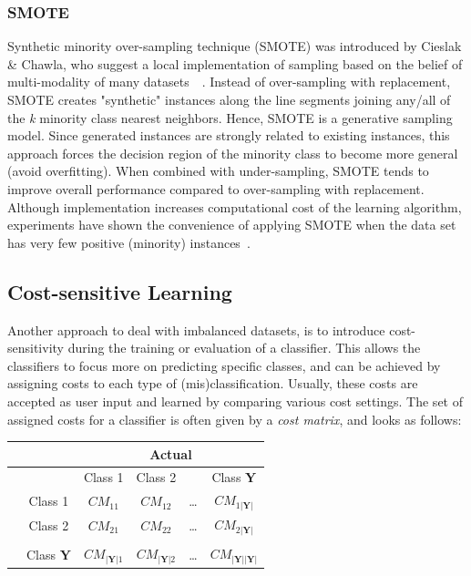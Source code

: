 \subsubsection{SMOTE}\label{smote}
Synthetic minority over-sampling technique (SMOTE) was introduced by Cieslak \& Chawla, who suggest a local implementation of sampling based on the belief of multi-modality of many datasets~\cite{StartGlobally08}~\cite{smote}.  Instead of over-sampling with replacement, SMOTE creates "synthetic" instances along the line segments joining any/all of the \textit{k} minority class nearest neighbors. Hence, SMOTE is a generative sampling model. Since generated instances are strongly related to existing instances, this approach forces the decision region of the minority class to become more general (avoid overfitting).  When combined with under-sampling, SMOTE tends to improve overall performance compared to over-sampling with replacement.  Although implementation increases computational cost of the learning algorithm, experiments have shown the convenience of applying SMOTE when the data set has very few positive (minority) instances~\cite{batista}.



\subsection{Cost-sensitive Learning}\label{cost-sensitivity}
Another approach to deal with imbalanced datasets, is to introduce cost-sensitivity during the training or evaluation of a classifier. This allows the classifiers to focus more on predicting specific classes, and can be achieved by assigning costs to each type of (mis)classification. Usually, these costs are accepted as user input and learned by comparing various cost settings. The set of assigned costs for a classifier is often given by a \textit{cost matrix}, and looks as follows:

\begin{table}[h]
\centering                            %
\begin{tabular}{|l| c| c c c c|}              %
\hline                                %
& & \multicolumn{4}{|c|}{Actual} \\
\hline 
& & Class 1 & Class 2 & & Class $\mathbf{Y}$\\ [0.5ex]
\hline                                      %
& Class 1 & $CM_{11}$ & $CM_{12}$ & \ldots & $CM_{1|\mathbf{Y}|}$ \\
& Class 2  & $CM_{21}$  &  $CM_{22}$  & \ldots & $CM_{2|\mathbf{Y}|}$ \\
\raisebox{1.5ex}{Predicted}  & & \raisebox{1.5ex}{\ldots} & \raisebox{1.5ex}{\ldots}  & & \raisebox{1.5ex}{\ldots} \\
& Class $\mathbf{Y}$ &  $CM_{|\mathbf{Y}|1}$ & $CM_{|\mathbf{Y}|2}$ & \ldots & $CM_{|\mathbf{Y}||\mathbf{Y}|}$ \\
\hline                          %
\end{tabular}
\label{tab:PPer}
\end{table}

